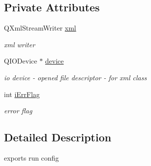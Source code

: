 \subsection*{Private Attributes}
\begin{DoxyCompactItemize}
\item 
\hypertarget{classCExportConfig_a5606f27f07973ded8fa1e850eaf3f179}{
QXmlStreamWriter \hyperlink{classCExportConfig_a5606f27f07973ded8fa1e850eaf3f179}{xml}}
\label{classCExportConfig_a5606f27f07973ded8fa1e850eaf3f179}

\begin{DoxyCompactList}\small\item\em xml writer \item\end{DoxyCompactList}\item 
\hypertarget{classCExportConfig_a638f31e665656264ef917946f0e384d8}{
QIODevice $\ast$ \hyperlink{classCExportConfig_a638f31e665656264ef917946f0e384d8}{device}}
\label{classCExportConfig_a638f31e665656264ef917946f0e384d8}

\begin{DoxyCompactList}\small\item\em io device -\/ opened file descriptor -\/ for xml class \item\end{DoxyCompactList}\item 
\hypertarget{classCExportConfig_a095da6fe51ae3abff5bf9ef9bf6ef9d1}{
int \hyperlink{classCExportConfig_a095da6fe51ae3abff5bf9ef9bf6ef9d1}{iErrFlag}}
\label{classCExportConfig_a095da6fe51ae3abff5bf9ef9bf6ef9d1}

\begin{DoxyCompactList}\small\item\em error flag \item\end{DoxyCompactList}\end{DoxyCompactItemize}


\subsection{Detailed Description}
exports run config 


